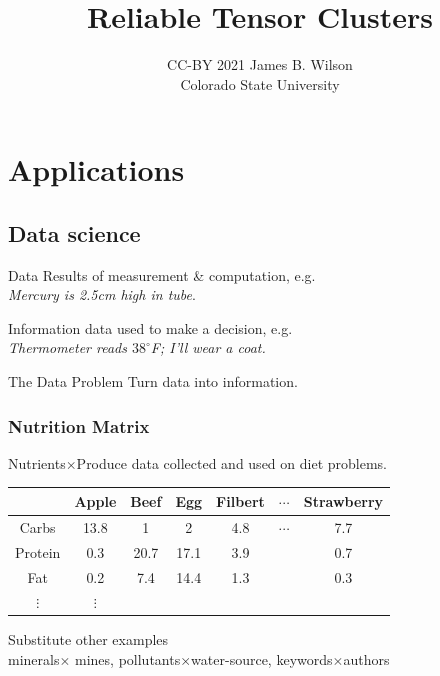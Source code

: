 \documentclass{beamer}
\begin{document}
\title{Reliable Tensor Clusters}
\author{CC-BY 2021 James B. Wilson\\ Colorado State University}

\maketitle

\section{Applications}

\subsection{Data science}
\begin{frame} 
    \begin{block}{Data}
        Results of measurement \& computation, e.g.\\[5pt]
        \centering
        \emph{Mercury is 2.5cm high in tube}.
    \end{block}

    \begin{block}{Information}
        data used to make a decision, e.g.\\[5pt]
        \centering
        \emph{Thermometer reads $38^{\circ}$F; I'll wear a coat.} 
    \end{block}
    

    \begin{block}{The Data Problem}
        Turn data into information.
    \end{block}

\end{frame}


\begin{frame}
    \frametitle{Nutrition Matrix}
    Nutrients$\times$Produce data collected and used on diet problems.
    \bigskip 

    \begin{tabular}{c|cccccc|}
             & Apple & Beef & Egg & Filbert & $\cdots$ & Strawberry \\
    \hline
    Carbs    & 13.8  & 1    & 2    & 4.8    & $\cdots$  & 7.7 \\
    Protein  & 0.3   & 20.7 & 17.1 & 3.9    &  & 0.7 \\
    Fat      & 0.2   & 7.4  & 14.4 & 1.3    &  & 0.3 \\
    $\vdots $ & $\vdots$ & & & & &\\
    \hline 
    \end{tabular} 

    \bigskip
    Substitute other examples\\
     minerals$\times$ mines, pollutants$\times$water-source, 
    keywords$\times$authors
\end{frame}
\end{document}
